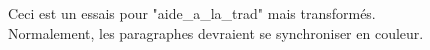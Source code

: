 Ceci est un essais pour "aide_a_la_trad" mais transformés.\\
Normalement, les paragraphes devraient se synchroniser en couleur.\\
\\